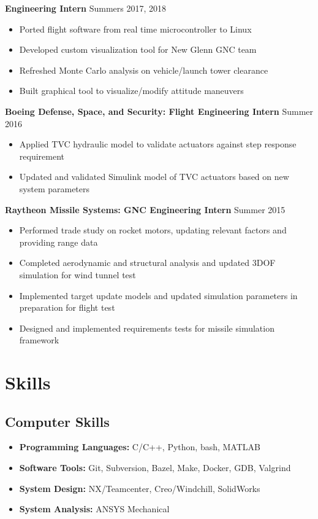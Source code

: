 \documentclass{article}
\begin{document}
\textbf{Engineering Intern} \hfill Summers 2017, 2018
\begin{itemize}
    \item Ported flight software from real time microcontroller to Linux
    \item Developed custom visualization tool for New Glenn GNC team
    \item Refreshed Monte Carlo analysis on vehicle/launch tower clearance
    \item Built graphical tool to visualize/modify attitude maneuvers
\end{itemize}

\textbf{Boeing Defense, Space, and Security: Flight Engineering Intern} \hfill Summer 2016
\begin{itemize}
    \item Applied TVC hydraulic model to validate actuators against step response requirement
    \item Updated and validated Simulink model of TVC actuators based on new system parameters
\end{itemize}

\textbf{Raytheon Missile Systems: GNC Engineering Intern} \hfill Summer 2015
\begin{itemize}
    \item Performed trade study on rocket motors, updating relevant factors and providing range data
    \item Completed aerodynamic and structural analysis and updated 3DOF simulation for wind tunnel test
    \item Implemented target update models and updated simulation parameters in preparation for flight test
    \item Designed and implemented requirements tests for missile simulation framework
\end{itemize}

\section{Skills}

\subsection{Computer Skills}
\begin{itemize}
    \item \textbf{Programming Languages:} C/C++, Python, bash, MATLAB
    \item \textbf{Software Tools:} Git, Subversion, Bazel, Make, Docker, GDB, Valgrind
    \item \textbf{System Design:} NX/Teamcenter, Creo/Windchill, SolidWorks
    \item \textbf{System Analysis:} ANSYS Mechanical
\end{itemize}
\end{document}

